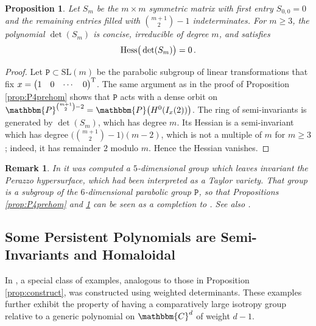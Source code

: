 \documentclass[aps,floatfix,groupedaddress,superscriptaddress,longbibliography,footinbib,notitlepage,showpacs]{revtex4-1}
\def\Hess{{\rm Hess}}
\newtheorem{remark}[theorem]{Remark}
\newtheorem{proposition}[theorem]{Proposition}
\begin{document}
\begin{proposition}\label{prop:van_hess}
Let $S_m$ be the $m\times m$ symmetric matrix with first entry $S_{0,0}=0$ and the remaining entries filled with $\binom{m+1}{2}-1$ indeterminates. For $m\geq 3$, the polynomial $\det(S_m)$ is concise, irreducible of degree $m$, and satisfies
\begin{equation}
\Hess\big(\det(S_m)\big) = 0\,.
\end{equation}
\end{proposition}
\begin{proof}
Let $\mathtt{P} \subset \mathrm{SL}(m)$ be the parabolic subgroup of linear transformations that fix 
$x = \begin{pmatrix} 1 & 0 & \cdots & 0 \end{pmatrix}^{\rm T}$. The same argument as in the proof of Proposition \ref{prop:P4prehom} shows that $\mathtt{P}$ acts with a dense orbit on $\mathbbm{P}^{\binom{m+1}{2}-2} = \mathbbm{P}\big(H^0(I_x(2))\big)$. The ring of semi-invariants is generated by $\det(S_m)$, which has degree $m$.  
Its Hessian is a semi-invariant which has  degree $\bigl(\binom{m+1}{2}-1\bigr)(m-2)$, which is not a multiple of $m$ for $m \geq 3$; indeed, it has remainder $2$ modulo $m$.
Hence the Hessian vanishes.
\end{proof}

\begin{remark}
In \cite[Example 4.3]{CNOS} it was computed a $5$-dimensional group which leaves invariant the Perazzo hypersurface, which had been interpreted as a Taylor variety. That group is a subgroup of the $6$-dimensional parabolic group $\mathtt{P}$, so that Propositions \ref{prop:P4prehom} and \ref{prop:van_hess} can be seen as a completion to \cite[Example 4.3]{CNOS}.
See also \cite[Remark 2.21]{COCDR}.
\end{remark}

\subsection{Some Persistent Polynomials are Semi-Invariants and Homaloidal}

In \cite{CRS}, a special class of examples, analogous to those in Proposition \ref{prop:construct}, was constructed using weighted determinants. These examples further exhibit the property of having a comparatively large isotropy group relative to a generic polynomial on $\mathbbm{C}^d$ of weight $d-1$.
\end{document}
